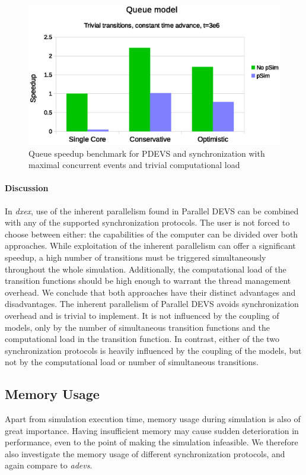\begin{figure}
	\center
	\includegraphics[width=\columnwidth]{fig/pdevs_no_sleep.eps}
	\caption{Queue speedup benchmark for PDEVS and synchronization with maximal concurrent events and trivial computational load}
	\label{fig:psim_plot_no_sleep}
\end{figure}

\paragraph{Discussion}
In \textit{dxex}, use of the inherent parallelism found in \textsf{Parallel DEVS} can be combined with any of the supported synchronization protocols.
The user is not forced to choose between either: the capabilities of the computer can be divided over both approaches.
While exploitation of the inherent parallelism can offer a significant speedup, a high number of transitions must be triggered simultaneously throughout the whole simulation.
Additionally, the computational load of the transition functions should be high enough to warrant the thread management overhead.
We conclude that both approaches have their distinct advantages and disadvantages.
The inherent parallelism of \textsf{Parallel DEVS} avoids synchronization overhead and is trivial to implement.
It is not influenced by the coupling of models, only by the number of simultaneous transition functions and the computational load in the transition function.
In contrast, either of the two synchronization protocols is heavily influenced by the coupling of the models, but not by the computational load or number of simultaneous transitions.

\subsection{Memory Usage}
Apart from simulation execution time, memory usage during simulation is also of great importance. Having insufficient memory may cause sudden deterioration in performance, even to the point of making the simulation infeasible.
We therefore also investigate the memory usage of different synchronization protocols, and again compare to \textit{adevs}.

